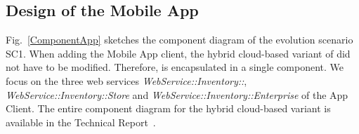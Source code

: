 %


\newpage

\subsection{Design of the Mobile App}\label{DesignMobileApp}
Fig.~\ref{ComponentApp} sketches the component diagram of the evolution scenario SC1. 
When adding the Mobile App client, the hybrid cloud-based variant of \CoCoME did not have to be modified. 
Therefore, \CoCoME is encapsulated in a single component. 
We focus on the three web services \textit{WebService::Inventory::}, \textit{WebService::Inventory::Store} and \textit{WebService::Inventory::Enterprise} of the App Client.
The entire component diagram for the hybrid cloud-based variant is available in the  Technical Report~\cite{HeinrichRostamiReussner2016_1000052688}. 


